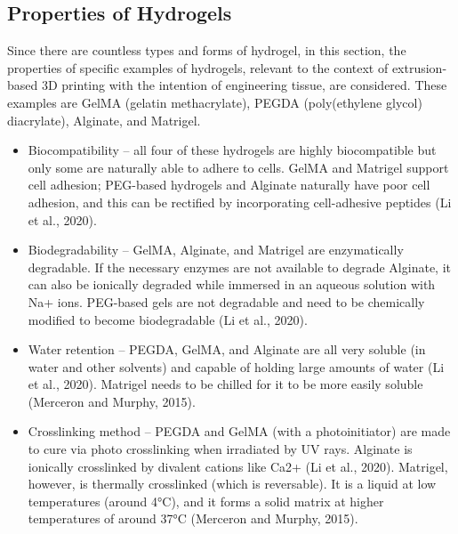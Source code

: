 \subsection{Properties of Hydrogels}
Since there are countless types and forms of  hydrogel, in this section, the properties of specific examples of hydrogels, relevant to the context of extrusion-based 3D printing with the intention of engineering tissue, are considered. These examples are GelMA (gelatin methacrylate), PEGDA (poly(ethylene glycol) diacrylate), Alginate, and Matrigel.
\begin{itemize}
  \item Biocompatibility – all four of these hydrogels are highly biocompatible but only some are naturally able to adhere to cells. GelMA and Matrigel support cell adhesion; PEG-based hydrogels and Alginate naturally have poor cell adhesion, and this can be rectified by incorporating cell-adhesive peptides (Li et al., 2020).
  \item Biodegradability – GelMA, Alginate, and Matrigel are enzymatically degradable. If the necessary enzymes are not available to degrade Alginate,  it can also be ionically degraded while immersed in an aqueous solution with Na+ ions. PEG-based gels are not degradable and need to be chemically modified to become biodegradable (Li et al., 2020).
  \item Water retention – PEGDA, GelMA, and Alginate are all very soluble (in water and other solvents) and capable of holding large amounts of water (Li et al., 2020). Matrigel needs to be chilled for it to be more easily soluble (Merceron and Murphy, 2015).
  \item Crosslinking method – PEGDA and GelMA (with a photoinitiator) are made to cure via photo crosslinking when irradiated by UV rays. Alginate is ionically crosslinked by divalent cations like Ca2+ (Li et al., 2020). Matrigel, however, is thermally crosslinked (which is reversable). It is a liquid at low temperatures (around 4°C), and it forms a solid matrix at higher temperatures of around 37°C (Merceron and Murphy, 2015).

\end{itemize}
